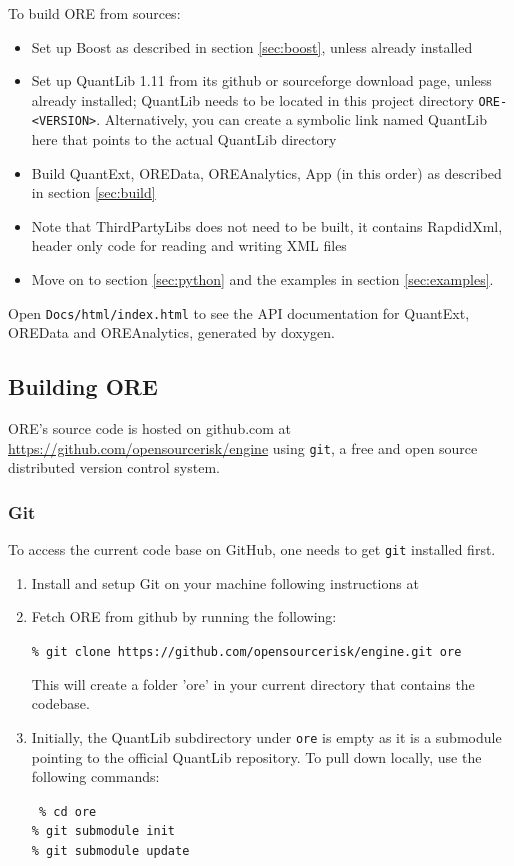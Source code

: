 \documentclass[12pt, a4paper]{article}
\begin{document}
\medskip
To build ORE from sources:
\begin{itemize}
\item Set up Boost as described in section \ref{sec:boost}, unless already installed
\item Set up QuantLib 1.11 \cite{QL,quantlib-install} from its github or sourceforge download page, unless already
  installed; QuantLib needs to be located in this project directory {\tt ORE-<VERSION>}. Alternatively, you can create a
  symbolic link named QuantLib here that points to the actual QuantLib directory
\item Build QuantExt, OREData, OREAnalytics, App (in this order) as described in section \ref{sec:build}
\item Note that ThirdPartyLibs does not need to be built, it contains RapdidXml, header only code for reading and
  writing XML files
\item Move on to section \ref{sec:python} and the examples in section \ref{sec:examples}.
\end{itemize}

Open {\tt Docs/html/index.html} to see the API documentation for QuantExt, OREData and OREAnalytics, generated by
doxygen.

\subsection{Building ORE}\label{sec:build_ore}

ORE's source code is hosted on github.com at \url{https://github.com/opensourcerisk/engine} using {\tt git}, a free and
open source distributed version control system.

\subsubsection{Git}

To access the current code base on GitHub, one needs to get {\tt git} installed first.
   
\begin{enumerate}
\item Install and setup Git on your machine following instructions at \cite{git-download}

\item Fetch ORE from github by running the following: 

{\tt\% git clone https://github.com/opensourcerisk/engine.git ore}      

This will create a folder 'ore' in your current directory that contains the codebase.

\item Initially, the QuantLib subdirectory under {\tt ore} is empty as it is a submodule pointing to the official
  QuantLib repository. To pull down locally, use the following commands:

{\tt
\% cd ore \\
\% git submodule init \\
\% git submodule update
}

\end{enumerate}
\end{document}
